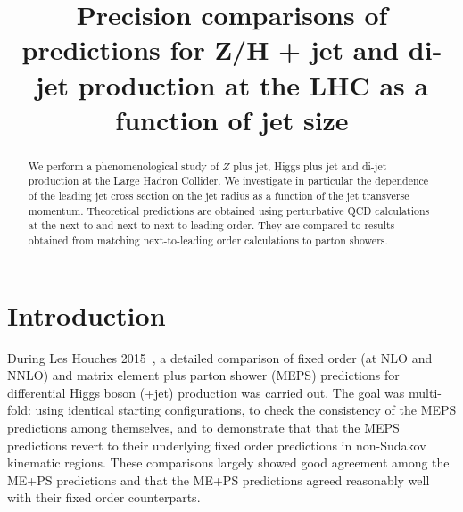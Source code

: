 \documentclass[aps,prd,twocolumn,fleqn,superscriptaddress,groupedaddress,nofootinbib,preprintnumbers,nobalancelastpage]{revtex4}
\begin{document}
\title{Precision comparisons of predictions for Z/H + jet
and di-jet production at the LHC as a function of jet size}

  
\begin{abstract}
  We perform a phenomenological study of
  $Z$ plus jet, Higgs plus jet and di-jet production
  at the Large Hadron Collider. We investigate in particular
  the dependence of the leading jet cross section on the
  jet radius as a function of the jet transverse momentum. 
  Theoretical predictions are obtained using perturbative QCD
  calculations at the next-to and next-to-next-to-leading order.
  They are compared to results obtained from matching 
  next-to-leading order calculations to parton showers.
\end{abstract}

\maketitle
\section{Introduction}
During Les Houches 2015~\cite{Badger:2016bpw}, a detailed 
comparison of fixed order (at NLO and NNLO) and matrix element plus parton shower (MEPS) predictions for differential Higgs
boson (+jet) production was carried out. The goal was multi-fold: using identical
starting configurations, to check the consistency of the MEPS
predictions among themselves, and to demonstrate that that the MEPS
predictions revert to their underlying fixed order predictions in
non-Sudakov kinematic regions. 
These comparisons largely showed good agreement among the ME+PS predictions and 
 that the ME+PS predictions agreed reasonably well with their fixed order counterparts. 
\end{document}
